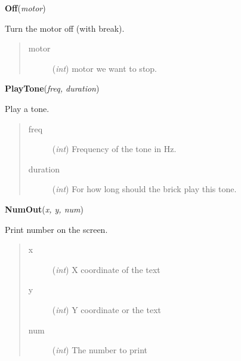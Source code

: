 \documentclass[10pt,a4paper]{article}
\begin{document}
 

\vspace{6pt}
{\bf Off}({\it motor}) 
    
    Turn the motor off (with break).
    




\begin{quote}
    \begin{description}
        
\item[motor] ({\emph{int}}) motor we want to stop.

    \end{description}
\end{quote}

 

\vspace{6pt}
{\bf PlayTone}({\it freq, duration}) 
    
    Play a tone.






\begin{quote}
    \begin{description}
        
\item[freq] ({\emph{int}}) Frequency of the tone in Hz.

\item[duration] ({\emph{int}}) For how long should the brick play this tone.

    \end{description}
\end{quote}

 

\vspace{6pt}
{\bf NumOut}({\it x, y, num}) 
    
    Print number on the screen.
 






\begin{quote}
    \begin{description}
        
\item[x] ({\emph{int}}) X coordinate of the text

\item[y] ({\emph{int}}) Y coordinate or the text

\item[num] ({\emph{int}}) The number to print

    \end{description}
\end{quote}
\end{document}

